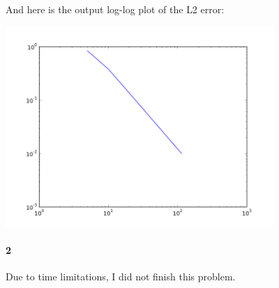 \documentclass{article}
\begin{document}
And here is the output log-log plot of the L2 error:

\begin{center}
\includegraphics[width=4in]{prob1_err.png}
\end{center}

\paragraph{2}
Due to time limitations, I did not finish this problem.
\end{document}
